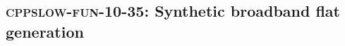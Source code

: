 \subsection{\textsc{cppslow-fun-10-35}: Synthetic broadband flat generation}
\label{cppslow-fun-10-35}
